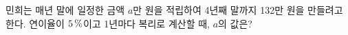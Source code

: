 민희는 매년 말에 일정한 금액 $a$만 원을 적립하여 4년째 말까지 132만 원을 만들려고 한다. 연이율이 $5\mkern3mu \%$이고 1년마다 복리로 계산할 때, $a$의 값은? 
